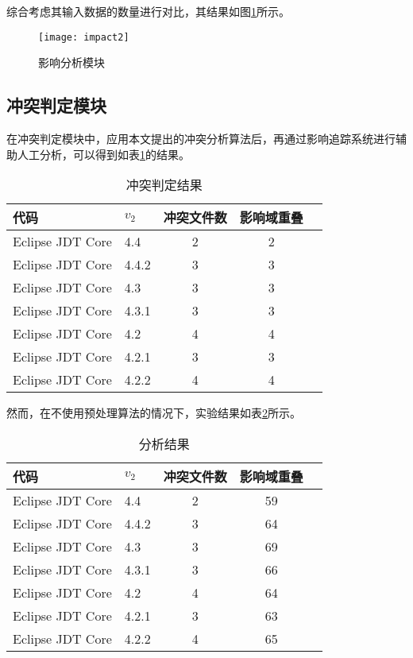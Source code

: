 综合考虑其输入数据的数量进行对比，其结果如图\ref {impact2}所示。

\begin{figure}[H]
	\centering
	\texttt{[image: impact2]}
	\caption {影响分析模块}
	\label {impact2}	
\end{figure}


\subsection{冲突判定模块}

在冲突判定模块中，应用本文提出的冲突分析算法后，再通过影响追踪系统进行辅助人工分析，可以得到如表\ref {data_compatible}的结果。

\begin{table}[H]
	\caption{冲突判定结果}
	\label{data_compatible}
	\centering
	\begin{tabular}{llccc}
		\toprule[1.5pt]
		{\heiti 代码} & {\heiti $v_2$} & {\heiti 冲突文件数} & {\heiti 影响域重叠}  \\\midrule[1pt]
		Eclipse JDT Core & 4.4 	& 2 & 2 \\
		Eclipse JDT Core & 4.4.2 & 3 & 3 \\
		Eclipse JDT Core & 4.3 	& 3 & 3 \\
		Eclipse JDT Core & 4.3.1 & 3 & 3 \\
		Eclipse JDT Core & 4.2 	& 4 & 4 \\
		Eclipse JDT Core & 4.2.1 & 3  &	3 \\
		Eclipse JDT Core & 4.2.2 & 4 & 4 \\
		\bottomrule[1.5pt]
	\end{tabular}
\end{table}

然而，在不使用预处理算法的情况下，实验结果如表\ref {data_compatible_2}所示。

\begin{table}[H]
	\caption{分析结果}
	\label{data_compatible_2}
	\centering
	\begin{tabular}{llccc}
		\toprule[1.5pt]
		{\heiti 代码} & {\heiti $v_2$} & {\heiti 冲突文件数} & {\heiti 影响域重叠} \\\midrule[1pt]
		Eclipse JDT Core & 4.4 	& 2 & 59 \\
		Eclipse JDT Core & 4.4.2 & 3 & 64 \\
		Eclipse JDT Core & 4.3 	& 3 & 69 \\
		Eclipse JDT Core & 4.3.1 & 3 & 66 \\
		Eclipse JDT Core & 4.2 	& 4 & 64 \\
		Eclipse JDT Core & 4.2.1 & 3 & 63 \\
		Eclipse JDT Core & 4.2.2 & 4 & 65 \\
		\bottomrule[1.5pt]
	\end{tabular}
\end{table}

